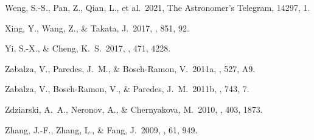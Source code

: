 \documentclass{aa}
\begin{document}
\begin{thebibliography}{}
 Weng, S.-S., Pan, Z., Qian, L., et al.\ 2021, The Astronomer's Telegram, 14297, 1.

 Xing, Y., Wang, Z., \& Takata, J.\ 2017, \apj, 851, 92.

 Yi, S.-X., \& Cheng, K.~S.\ 2017, \mnras, 471, 4228.

 Zabalza, V., Paredes, J.~M., \& Bosch-Ramon, V.\ 2011a, \aap, 527, A9.

 Zabalza, V., Bosch-Ramon, V., \& Paredes, J.~M.\ 2011b, \apj, 743, 7.

 Zdziarski, A.~A., Neronov, A., \& Chernyakova, M.\ 2010, \mnras, 403, 1873.

 Zhang, J.-F., Zhang, L., \& Fang, J.\ 2009, \pasj, 61, 949.




\end{thebibliography}
\end{document}
